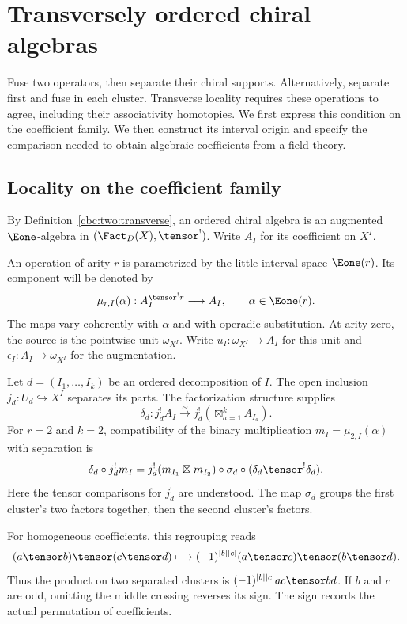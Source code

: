 \chapter{Transversely ordered chiral algebras}
\label{cbc:ord:chapter}
Fuse two operators, then separate their chiral supports.
Alternatively, separate first and fuse in each cluster.
Transverse locality requires these operations to agree, including
their associativity homotopies.
We first express this condition on the coefficient family.
We then construct its interval origin and specify the comparison
needed to obtain algebraic coefficients from a field theory.

\section{Locality on the coefficient family}
By Definition~\ref{cbc:two:transverse}, an ordered chiral algebra is
an augmented $\Eone$-algebra in $(\Fact_D(X),\tensor^!)$.
Write $A_I$ for its coefficient on $X^I$.

An operation of arity $r$ is parametrized by the little-interval
space $\Eone(r)$. Its component will be denoted by
\[
 \mu_{r,I}(\alpha):A_I^{\tensor^!r}\longrightarrow A_I,
 \qquad \alpha\in\Eone(r).
\]
The maps vary coherently with $\alpha$ and with operadic substitution.
At arity zero, the source is the pointwise unit $\omega_{X^I}$.
Write $u_I:\omega_{X^I}\to A_I$ for this unit and
$\epsilon_I:A_I\to\omega_{X^I}$ for the augmentation.

Let $d=(I_1,\ldots,I_k)$ be an ordered decomposition of $I$.
The open inclusion $j_d:U_d\hookrightarrow X^I$ separates its parts.
The factorization structure supplies
\[
 \delta_d:j_d^!A_I\xrightarrow{\sim}
 j_d^!\left(\mathop{\boxtimes}_{a=1}^k A_{I_a}\right).
\]
For $r=2$ and $k=2$, compatibility of the binary multiplication
$m_I=\mu_{2,I}(\alpha)$ with separation is
\begin{equation}
 \delta_d\circ j_d^!m_I
 =j_d^!(m_{I_1}\boxtimes m_{I_2})\circ\sigma_d
       \circ(\delta_d\tensor^!\delta_d).
 \label{eq:cbc:ord:locality}
\end{equation}
Here the tensor comparisons for $j_d^!$ are understood.
The map $\sigma_d$ groups the first cluster's two factors together,
then the second cluster's factors.

For homogeneous coefficients, this regrouping reads
\[
 (a\tensor b)\tensor(c\tensor d)
 \longmapsto
 (-1)^{|b||c|}(a\tensor c)\tensor(b\tensor d).
\]
Thus the product on two separated clusters is
$(-1)^{|b||c|}ac\tensor bd$.
If $b$ and $c$ are odd, omitting the middle crossing reverses its sign.
The sign records the actual permutation of coefficients.

